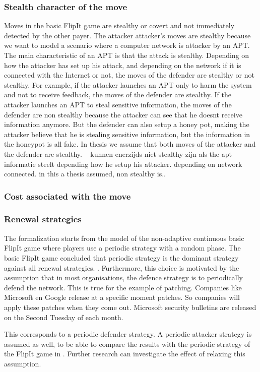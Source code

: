 \subsubsection{Stealth character of the move}
Moves in the basic FlipIt game are stealthy or covert and not immediately detected by the other payer. The attacker attacker's moves are stealthy because we want to model a scenario where a computer network is attacker by an APT. The main characteristic of an APT is that the attack is stealthy. Depending on how the attacker has set up his attack, and depending on the network if it is connected with the Internet or not, the moves of the defender are stealthy or not stealthy. For example, if the attacker launches an APT only to harm the system and not to receive feedback, the moves of the defender are stealthy. If the attacker launches an APT to steal sensitive information, the moves of the defender are non stealthy because the attacker can see that he doesnt receive information anymore. But the defender can also setup a honey pot, making the attacker believe that he is stealing sensitive information, but the information in the honeypot is all fake. In thesis we assume that both moves of the attacker and the defender are stealthy. -- kunnen enerzijds niet stealthy zijn als the apt informatie steelt depending how he setup his attacker. depending on network connected. in this a thesis assumed, non stealthy is..
\subsubsection{Cost associated with the move}
\subsubsection{Renewal strategies}
The formalization starts from the model of the non-adaptive continuous basic FlipIt game where players use a periodic strategy with a random phase. The basic FlipIt game concluded that periodic strategy is the dominant strategy against all renewal strategies. . Furthermore, this choice is motivated by the assumption that in most organisations, the defence strategy is to periodically defend the network.  This is true for the example of patching. Companies like Microsoft en Google release at a specific moment patches. So companies will apply these patches when they come out. Microsoft security bulletins are released on the Second Tuesday of each month. \cite{MicroPatch}

This corresponds to a periodic defender strategy.  A periodic attacker strategy is assumed as well, to be able to compare the results with the periodic strategy of the FlipIt game in \cite{FlipIt}. %
Further research can investigate the effect of relaxing this assumption. \\









